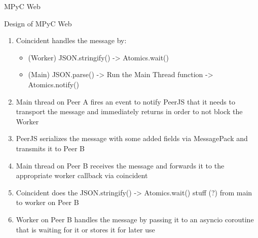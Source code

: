 \begin{block}{MPyC Web}
\begin{block}{Design of MPyC Web}
\begin{enumerate}
\begin{Shaded}
\begin{Highlighting}[]
\StringTok{\textquotesingle{}}
\end{Highlighting}
\end{Shaded}

  \begin{itemize}
  \tightlist
  \item
    worker calls a main thread function (sendRuntimeMessage) via a coincident proxy and passes the serialized value, as well as the destination Peer's ID (Peer B). The worker does not need to await the result of this call, but it does because of xworker.sync.
  \end{itemize}
\item
  Coincident handles the message by:

  \begin{itemize}
  \tightlist
  \item
    (Worker) JSON.stringify() -\textgreater{} Atomics.wait()
  \item
    (Main) JSON.parse() -\textgreater{} Run the Main Thread function -\textgreater{} Atomics.notify()
  \end{itemize}
\item
  Main thread on Peer A fires an event to notify PeerJS that it needs to transport the message and immediately returns in order to not block the Worker
\item
  PeerJS serializes the message with some added fields via MessagePack and transmits it to Peer B
\item
  Main thread on Peer B receives the message and forwards it to the appropriate worker callback via coincident
\item
  Coincident does the JSON.stringify() -\textgreater{} Atomics.wait() stuff (?) from main to worker on Peer B
\item
  Worker on Peer B handles the message by passing it to an asyncio coroutine that is waiting for it or stores it for later use
\end{enumerate}
\end{block}


\end{block}
